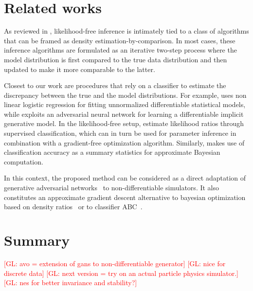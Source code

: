 \documentclass[twocolumn,superscriptaddress,aps]{revtex4-1}
\newcommand{\glnote}[1]{\textcolor{red}{[GL: #1]}}
\theoremstyle{plain}
\begin{document}

\section{Related works}

As reviewed in \cite{2016arXiv161003483M}, likelihood-free inference is
intimately tied to a class of algorithms that can be framed as density
estimation-by-comparison. In most cases, these inference algorithms are
formulated as an iterative two-step process where the model distribution is
first compared to the true data distribution and then updated to make it more
comparable to the latter.

Closest to our work are procedures that rely on a classifier to estimate the
discrepancy between the true and the model distributions. For example,
\citep{gutmann2012noise} uses non linear logistic regression for fitting
unnormalized differentiable statistical models, while
\citep{goodfellow2014generative} exploits an adversarial neural network for
learning a differentiable implicit generative model. In the likelihood-free
setup, \citep{cranmer2015approximating,2016arXiv161110242D} estimate likelihood
ratios through supervised classification, which can in turn be used for
parameter inference in combination with a gradient-free optimization algorithm.
Similarly, \citep{gutmann2017likelihood} makes use of classification accuracy as
a summary statistics for approximate Bayesian computation.

In this context, the proposed method can be considered as a direct adaptation of
generative adversarial networks~\citep{goodfellow2014generative} to
non-differentiable simulators. It also constitutes an approximate gradient
descent alternative to bayesian optimization based on density
ratios~\citep{cranmer2015approximating} or to classifier
ABC~\citep{gutmann2017likelihood}.



\section{Summary}

\glnote{avo = extension of gans to non-differentiable generator}
\glnote{nice for discrete data}
\glnote{next version = try on an actual particle physics simulator.}
\glnote{nes for better invariance and stability?}
\end{document}
